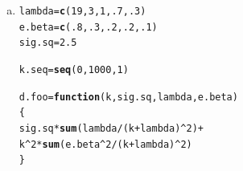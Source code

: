 \documentclass{article}\usepackage[]{graphicx}\usepackage[]{color}
\makeatletter
\newcommand{\hlnum}[1]{\textcolor[rgb]{0.686,0.059,0.569}{#1}}%
\newcommand{\hlopt}[1]{\textcolor[rgb]{0,0,0}{#1}}%
\newcommand{\hlstd}[1]{\textcolor[rgb]{0.345,0.345,0.345}{#1}}%
\newcommand{\hlkwa}[1]{\textcolor[rgb]{0.161,0.373,0.58}{\textbf{#1}}}%
\newcommand{\hlkwb}[1]{\textcolor[rgb]{0.69,0.353,0.396}{#1}}%
\newcommand{\hlkwc}[1]{\textcolor[rgb]{0.333,0.667,0.333}{#1}}%
\newcommand{\hlkwd}[1]{\textcolor[rgb]{0.737,0.353,0.396}{\textbf{#1}}}%
\newenvironment{kframe}{%
 \def\at@end@of@kframe{}%
 \ifinner\ifhmode%
  \def\at@end@of@kframe{\end{minipage}}%
  \begin{minipage}{\columnwidth}%
 \fi\fi%
 \def\FrameCommand##1{\hskip\@totalleftmargin \hskip-\fboxsep
 \colorbox{shadecolor}{##1}\hskip-\fboxsep
     \hskip-\linewidth \hskip-\@totalleftmargin \hskip\columnwidth}%
 \MakeFramed {\advance\hsize-\width
   \@totalleftmargin\z@ \linewidth\hsize
   \@setminipage}}%
 {\par\unskip\endMakeFramed%
 \at@end@of@kframe}
\newenvironment{knitrout}{}{} %
\makeatother
\begin{document}
\begin{enumerate}[(a)]

\item

\begin{knitrout}
\color{fgcolor}\begin{kframe}
\begin{alltt}
  \hlstd{lambda} \hlkwb{=} \hlkwd{c}\hlstd{(}\hlnum{19}\hlstd{,} \hlnum{3}\hlstd{,} \hlnum{1}\hlstd{,} \hlnum{.7}\hlstd{,} \hlnum{.3}\hlstd{)}
  \hlstd{e.beta} \hlkwb{=} \hlkwd{c}\hlstd{(}\hlnum{.8}\hlstd{,} \hlnum{.3}\hlstd{,} \hlnum{.2}\hlstd{,} \hlnum{.2}\hlstd{,} \hlnum{.1}\hlstd{)}
  \hlstd{sig.sq} \hlkwb{=} \hlnum{2.5}

  \hlstd{k.seq} \hlkwb{=} \hlkwd{seq}\hlstd{(}\hlnum{0}\hlstd{,} \hlnum{1000}\hlstd{,} \hlnum{1}\hlstd{)}

  \hlstd{d.foo} \hlkwb{=} \hlkwa{function}\hlstd{(}\hlkwc{k}\hlstd{,} \hlkwc{sig.sq}\hlstd{,} \hlkwc{lambda}\hlstd{,} \hlkwc{e.beta}\hlstd{)}
  \hlstd{\{}
    \hlstd{sig.sq} \hlopt{*} \hlkwd{sum}\hlstd{( lambda} \hlopt{/} \hlstd{(k}\hlopt{+}\hlstd{lambda)}\hlopt{^}\hlnum{2} \hlstd{)} \hlopt{+}
      \hlstd{k}\hlopt{^}\hlnum{2} \hlopt{*} \hlkwd{sum}\hlstd{( e.beta}\hlopt{^}\hlnum{2} \hlopt{/} \hlstd{(k}\hlopt{+}\hlstd{lambda)}\hlopt{^}\hlnum{2} \hlstd{)}
  \hlstd{\}}


\end{alltt}
\end{kframe}
\end{knitrout}
\end{enumerate}
\end{document}
